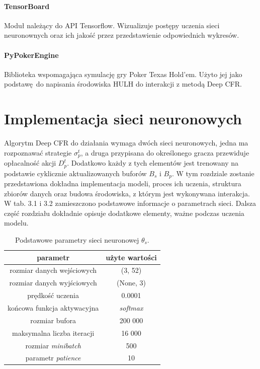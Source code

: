 \documentclass[12pt,oneside,a4paper]{report}
\begin{document}
\paragraph{TensorBoard}
Moduł należący do API Tensorflow. Wizualizuje postępy uczenia sieci neuronownych oraz ich 
jakość przez przedstawienie odpowiednich wykresów. 


\paragraph{PyPokerEngine}

Biblioteka wspomagająca symulację gry Poker Texas Hold'em.
Użyto jej jako podstawę do napisania środowiska HULH do interakcji z 
metodą Deep CFR.

\section{Implementacja sieci neuronowych}

Algorytm Deep CFR do działania wymaga dwóch sieci neuronowych, jedna ma rozpoznawać strategie
$\sigma_{p}^{t}$, a
druga przypisana do określonego gracza przewiduje opłacalność akcji $D_{p}^{t}$. 
Dodatkowo każdy z tych elementów
jest trenowany na podstawie cyklicznie aktualizowanych buforów $B_{s}$ i $B_{p}$. W tym rozdziale zostanie
przedstawiona dokładna implementacja modeli, proces ich uczenia, struktura zbiorów danych oraz
budowa środowiska, z którym jest wykonywana interakcja. W tab. 3.1 i 3.2 zamieszczono podstawowe 
informacje
o parametrach sieci. Dalsza część rozdziału dokładnie opisuje dodatkowe elementy, ważne podczas
uczenia modelu.

\vspace{1cm}
\begin{table}[h!]
\centering
\caption{Podstawowe parametry sieci neuronowej $\theta_{s}$.}
\begin{tabular}{|c|c| }
   \hline
   parametr & użyte wartości \\
    \hline
   rozmiar danych wejściowych & (3, 52) \\
   \hline
   rozmiar danych wyjściowych & (None, 3) \\  
   \hline
   prędkość uczenia & 0.0001 \\
   \hline
   końcowa funkcja aktywacyjna & \emph{softmax} \\
   \hline
   rozmiar bufora & 200 000 \\
   \hline
   maksymalna liczba iteracji & 16 000 \\
   \hline
   rozmiar \emph{minibatch} &  500\\
   \hline
   parametr \emph{patience} &  10\\
   \hline
\end{tabular}
\end{table}
\end{document}
